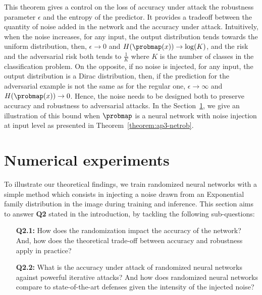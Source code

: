 This theorem gives a control on the loss of accuracy under attack \wrt the robustness parameter $\epsilon$ and the entropy of the predictor.
It provides a tradeoff between the quantity of noise added in the network and the accuracy under attack.
Intuitively, when the noise increases, for any input, the output distribution tends towards the uniform distribution, then, $\epsilon\rightarrow0$ and $H(\probmap(x))\rightarrow \log(K)$, and the risk and the adversarial risk both tends to $\frac{1}{K}$ where $K$ is the number of classes in the classification problem.
On the opposite, if no noise is injected, for any input, the output distribution is a  Dirac distribution, then, if the prediction for the adversarial example is not the same as for the regular one, $\epsilon\rightarrow\infty$ and $H(\probmap(x))\rightarrow 0$.
Hence, the noise needs to be designed both to preserve accuracy and robustness to adversarial attacks.
In the Section~\ref{section:ap3-experiment}, we give an illustration of this bound when $\probmap$ is a neural network with noise injection at input level as presented in Theorem~\ref{theorem:ap3-netrob}.

\section{Numerical experiments}
\label{section:ap3-experiment}

To illustrate our theoretical findings, we train randomized neural networks with a simple method which consists in injecting a noise drawn from an Exponential family distribution in the image during training and inference.
This section aims to answer \textbf{Q2} stated in the introduction, by tackling the following sub-questions:
\begin{itemize}
  \item[\textbf{Q2.1:}] How does the randomization impact the accuracy of the network? And, how does the theoretical trade-off between accuracy and robustness apply in practice? 
  \item[\textbf{Q2.2:}] What is the accuracy under attack of randomized neural networks against powerful iterative attacks? And how does randomized neural networks compare to state-of-the-art defenses given the intensity of the injected noise? 
\end{itemize}

